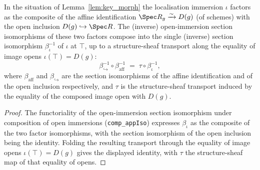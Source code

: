 \begin{lemma}\leanok
  \label{lem:tile_appIso_comp}
  In the situation of Lemma~\ref{lem:key_morph} the localisation immersion \(\iota\) factors as the
  composite of the affine identification \(\Spec R_g \xrightarrow{\sim} D(g)\) (of schemes) with the open
  inclusion \(D(g) \hookrightarrow \Spec R\). The (inverse) open-immersion section isomorphisms of these
  two factors compose into the single (inverse) section isomorphism \(\beta_\iota^{-1}\) of \(\iota\) at
  \(\top\), up to a structure-sheaf transport along the equality of image opens
  \(\iota(\top) = D(g)\):
  \[
    \beta_{\hookrightarrow}^{-1} \circ \beta_{\mathrm{aff}}^{-1}
    \;=\;
    \tau \circ \beta_\iota^{-1},
  \]
  where \(\beta_{\mathrm{aff}}\) and \(\beta_{\hookrightarrow}\) are the section isomorphisms of the
  affine identification and of the open inclusion respectively, and \(\tau\) is the structure-sheaf
  transport induced by the equality of the composed image open with \(D(g)\).
\end{lemma}
\begin{proof}

\leanok
  The functoriality of the open-immersion section isomorphism under composition of open immersions
  (\texttt{comp\_appIso}) expresses \(\beta_\iota\) as the composite of the two factor isomorphisms, with
  the section isomorphism of the open inclusion being the identity. Folding the resulting transport
  through the equality of image opens \(\iota(\top) = D(g)\) gives the displayed identity, with \(\tau\)
  the structure-sheaf map of that equality of opens.
\end{proof}

